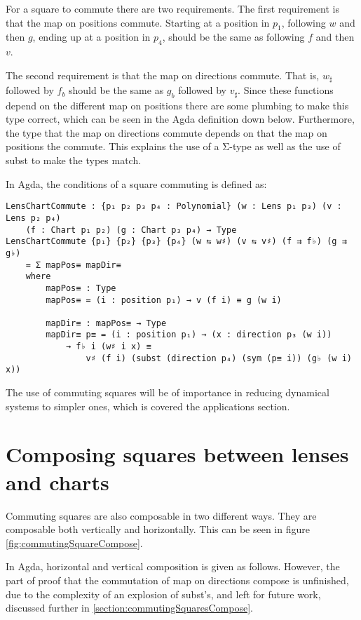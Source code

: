 For a square to commute there are two requirements. The first requirement is that the map on positions commute. Starting at a position in $p_1$, following $w$ and then $g$, ending up at a position in $p_4$, should be the same as following $f$ and then $v$. 

The second requirement is that the map on directions commute. That is, $w_\sharp$ followed by $f_b$ should be the same as $g_b$ followed by $v_\sharp$. Since these functions depend on the different map on positions there are some plumbing to make this type correct, which can be seen in the Agda definition down below. Furthermore, the type that the map on directions commute depends on that the map on positions the commute. This explains the use of a Σ-type as well as the use of subst to make the types match.

In Agda, the conditions of a square commuting is defined as:
\begin{verbatim}
LensChartCommute : {p₁ p₂ p₃ p₄ : Polynomial} (w : Lens p₁ p₃) (v : Lens p₂ p₄)
    (f : Chart p₁ p₂) (g : Chart p₃ p₄) → Type
LensChartCommute {p₁} {p₂} {p₃} {p₄} (w ⇆ w♯) (v ⇆ v♯) (f ⇉ f♭) (g ⇉ g♭)
    = Σ mapPos≡ mapDir≡
    where
        mapPos≡ : Type
        mapPos≡ = (i : position p₁) → v (f i) ≡ g (w i)

        mapDir≡ : mapPos≡ → Type
        mapDir≡ p≡ = (i : position p₁) → (x : direction p₃ (w i))
            → f♭ i (w♯ i x) ≡ 
                v♯ (f i) (subst (direction p₄) (sym (p≡ i)) (g♭ (w i) x))
\end{verbatim}

The use of commuting squares will be of importance in reducing dynamical systems to simpler ones, which is covered the applications section. 

\section{Composing squares between lenses and charts}
Commuting squares are also composable in two different ways. They are composable both vertically and horizontally. This can be seen in figure \ref{fig:commutingSquareCompose}.

%      
In Agda, horizontal and vertical composition is given as follows. However, the part of proof that the commutation of map on directions compose is unfinished, due to the complexity of an explosion of subst's, and left for future work, discussed further in \ref{section:commutingSquaresCompose}.

